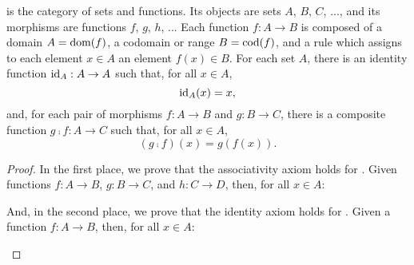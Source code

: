 \begin{example}
  \label{ex:category-set}


  \set is the category of sets and functions. Its objects are sets
  $A$, $B$, $C$, ..., and its morphisms are functions $f$, $g$, $h$,
  ... Each function $f: A \to B$ is composed of a domain $A =
  \operatorname{dom}(f)$, a codomain or range $B = \operatorname{cod}(f)$, and a rule which
  assigns to each element $x \in A$ an element $f(x) \in B$. For each
  set $A$, there is an identity function $\operatorname{id}_{A}: A \to A$ such that,
  for all $x \in A$,
  \begin{equation}
    \label{eq:set-identity}
    \operatorname{id}_{A}(x) = x
    \text{,}
  \end{equation}
  and, for each pair of morphisms $f: A \to B$ and $g: B \to C$, there
  is a composite function $g \comp f: A \to C$ such that, for all $x
  \in A$,
  \begin{equation}
    \label{eq:set-composition}
    (g \comp f)(x) = g(f(x))
    \text{.}
  \end{equation}

  \begin{proof}

    In the first place, we prove that the associativity axiom holds
    for \set. Given functions $f: A \to B$, $g: B \to C$, and $h: C
    \to D$, then, for all $x \in A$:
    \begin{steps}
        \eqby{\eqref{eq:set-composition}}
        \eqby{\eqref{eq:set-composition}}
        \eqby{\eqref{eq:set-composition}}
        \eqby{\eqref{eq:set-composition}}
    \end{steps}
    And, in the second place, we prove that the identity axiom holds
    for \set. Given a function $f: A \to B$, then, for all $x \in A$:
    \begin{steps}
        \eqby{\eqref{eq:set-composition}}
        \eqby{\eqref{eq:set-identity}}
        \eqby{\eqref{eq:set-identity}}
        \eqby{\eqref{eq:set-composition}}
    \end{steps}

  \end{proof}

  \begin{remark}
    \label{re:foundations}


\end{remark}
\end{example}
